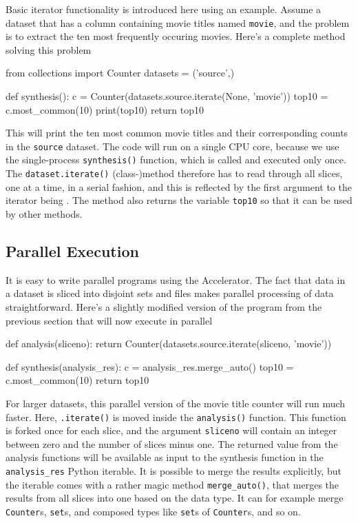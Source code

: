 Basic iterator functionality is introduced here using an example.
Assume a dataset that has a column containing movie titles named
\texttt{movie}, and the problem is to extract the ten most frequently
occuring movies.  Here's a complete method solving this problem
\begin{python}
from collections import Counter
datasets = ('source',)

def synthesis():
    c = Counter(datasets.source.iterate(None, 'movie'))
    top10 = c.most_common(10)
    print(top10)
    return top10
\end{python}
This will print the ten most common movie titles and their
corresponding counts in the \texttt{source} dataset.  The code will
run on a single CPU core, because we use the single-process
\texttt{synthesis()} function, which is called and executed only once.
The \texttt{dataset.iterate()} (class-)method therefore has to read
through all slices, one at a time, in a serial fashion, and this is
reflected by the first argument to the iterator being \pyNone.  The
method also returns the variable \texttt{top10} so that it can be used
by other methods.



\subsection{Parallel Execution}
It is easy to write parallel programs using the Accelerator.  The fact
that data in a dataset is sliced into disjoint sets and files makes
parallel processing of data straightforward.  Here's a slightly
modified version of the program from the previous section that will
now execute in parallel
\begin{python}
def analysis(sliceno):
    return Counter(datasets.source.iterate(sliceno, 'movie'))

def synthesis(analysis_res):
    c = analysis_res.merge_auto()
    top10 = c.most_common(10)
    return top10
\end{python}
For larger datasets, this parallel version of the movie title counter
will run much faster.  Here, \texttt{.iterate()} is moved inside the
\texttt{analysis()} function.  This function is forked once for each
slice, and the argument \texttt{sliceno} will contain an integer
between zero and the number of slices minus one.  The returned value
from the analysis functions will be available as input to the
synthesis function in the \texttt{analysis\_res} Python iterable.  It
is possible to merge the results explicitly, but the iterable
comes with a rather magic method \texttt{merge\_auto()}, that merges
the results from all slices into one based on the data type.  It can
for example merge \texttt{Counter}s, \texttt{set}s, and composed types
like \texttt{set}s of \texttt{Counter}s, and so on.


